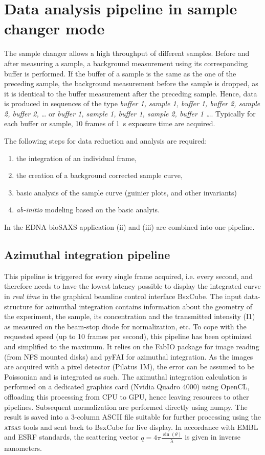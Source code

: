 \documentclass[preprint,pdf]{iucr}              %
\begin{document}
\section{Data analysis pipeline in sample changer mode}

The sample changer allows a high throughput of different samples.
Before and after measuring a sample, a background measurement using its
corresponding buffer is performed.
If the buffer of a sample is the same as the one of the preceding sample, the
background measurement before the sample is dropped, as it is identical to the
buffer measurement after the preceding sample.
Hence, data is produced in sequences of the type \textit{buffer 1, sample 1,
buffer 1, buffer 2, sample 2, buffer 2, \ldots}  or  \textit{buffer 1, sample 1,
buffer 1,  sample 2, buffer 1 \ldots}.
Typically for each buffer or sample, 10 frames of 1~s exposure time are acquired.

The following steps for data reduction and analysis are required:
\begin{enumerate}
\item the integration of an individual frame,
\item the creation of a background corrected sample curve,
\item basic analysis of the sample curve (guinier plots, and other invariants)
\item \textit{ab-initio} modeling based on the basic analyis.
\end{enumerate}
In the EDNA bioSAXS application (ii) and (iii) are combined into one pipeline.

\subsection{Azimuthal integration pipeline}

This pipeline is triggered for every single frame acquired, i.e. every second,
and therefore needs to have the lowest latency possible to display the integrated curve
in \textit{real time} in the graphical beamline control interface BsxCube.
The input data-structure for azimuthal integration contains
information about the geometry of the experiment, the sample, its concentration
and the transmitted intensity (I1) as measured on the beam-stop diode for
normalization, etc.
To cope with the requested speed (up to 10 frames per second), this pipeline
has been optimized and simplified to the maximum.
It relies on the FabIO\cite{fabio} package for image reading (from NFS mounted disks) and
pyFAI\cite{pyFAI} for azimuthal integration.
As the images are acquired with a pixel detector (Pilatus 1M), the error can be
assumed to be Poissonian and is integrated as such.
The azimuthal integration calculation is performed on a dedicated graphics card
(Nvidia Quadro 4000) using OpenCL, offloading this processing from CPU to GPU,
hence leaving resources to other pipelines.
Subsequent normalization are performed directly using numpy\cite{numpy}.
The result is saved into a 3-column ASCII file suitable for further processing
using the \textsc{atsas} tools\cite{atsas} and sent back to BsxCube for
live display.
In accordance with EMBL and ESRF standards, the scattering vector
$q=4\pi\frac{\sin(\theta)}{\lambda}$ is given in inverse nanometers.
\end{document}
